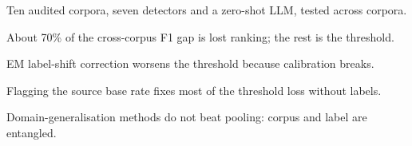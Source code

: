 \item Ten audited corpora, seven detectors and a zero-shot LLM, tested across corpora.
\item About 70\% of the cross-corpus F1 gap is lost ranking; the rest is the threshold.
\item EM label-shift correction worsens the threshold because calibration breaks.
\item Flagging the source base rate fixes most of the threshold loss without labels.
\item Domain-generalisation methods do not beat pooling: corpus and label are entangled.
